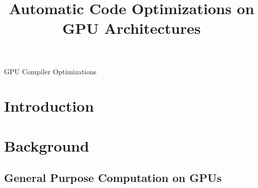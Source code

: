 \documentclass[conference]{IEEEtran}
\begin{document}
\title{Automatic Code Optimizations on GPU Architectures}

\author{
}


\maketitle

\begin{abstract}

\end{abstract}

\begin{IEEEkeywords}
GPU Compiler Optimizations
\end{IEEEkeywords}

\section{Introduction}


			

	

\section{Background}

	\subsection{General Purpose Computation on GPUs}
	
\end{document}
